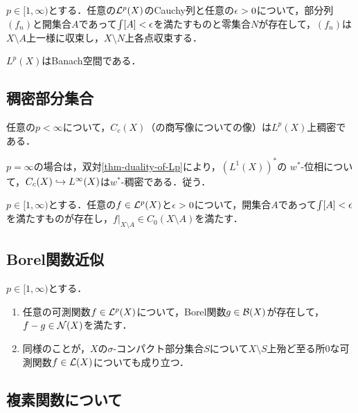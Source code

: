 \documentclass[uplatex,dvipdfmx]{jsreport}
\begin{document}
\begin{proposition}
    $p\in[1,\infty)$とする．任意の$\mathcal{L}^p(X)$のCauchy列と任意の$\epsilon>0$について，部分列$(f_n)$と開集合$A$であって$\int[A]<\epsilon$を満たすものと零集合$N$が存在して，$(f_n)$は$X\setminus A$上一様に収束し，$X\setminus N$上各点収束する．
\end{proposition}

\begin{theorem}
    $L^p(X)$はBanach空間である．
\end{theorem}

\subsection{稠密部分集合}

\begin{proposition}\label{prop-dense-subset-of-Lp}
    任意の$p<\infty$について，$C_c(X)$（の商写像についての像）は$L^p(X)$上稠密である．
\end{proposition}
\begin{remarks}
    $p=\infty$の場合は，双対\ref{thm-duality-of-Lp}により，$(L^1(X))^*$の
    $w^*$-位相について，$C_c(X)\hookrightarrow L^\infty(X)$は$w^*$-稠密である．従う．
\end{remarks}

\begin{corollary}
    $p\in[1,\infty)$とする．任意の$f\in\mathcal{L}^p(X)$と$\epsilon>0$について，開集合$A$であって$\int[A]<\epsilon$を満たすものが存在し，$f|_{X\setminus A}\in C_0(X\setminus A)$を満たす．
\end{corollary}

\subsection{Borel関数近似}

\begin{proposition}
    $p\in[1,\infty)$とする．
    \begin{enumerate}
        \item 任意の可測関数$f\in\mathcal{L}^p(X)$について，Borel関数$g\in\mathcal{B}(X)$が存在して，$f-g\in\mathcal{N}(X)$を満たす．
        \item 同様のことが，$X$の$\sigma$-コンパクト部分集合$S$について$X\setminus S$上殆ど至る所$0$な可測関数$f\in\mathcal{L}(X)$についても成り立つ．
    \end{enumerate}
\end{proposition}

\subsection{複素関数について}
\end{document}
